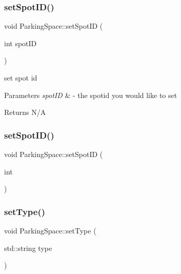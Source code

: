 \subsubsection{\texorpdfstring{set\+Spot\+I\+D()}{setSpotID()}\hspace{0.1cm}{\footnotesize\ttfamily [1/2]}}
{\footnotesize\ttfamily void Parking\+Space\+::set\+Spot\+ID (\begin{DoxyParamCaption}\item[{int}]{spot\+ID }\end{DoxyParamCaption})}



set spot id 


\begin{DoxyParams}{Parameters}
{\em spot\+ID} & -\/ the spotid you would like to set \\
\hline
\end{DoxyParams}
\begin{DoxyReturn}{Returns}
N/A 
\end{DoxyReturn}
\mbox{\label{class_parking_space_a9acf2d76a9b9f84d049b44dd0d4a5c8b}} 
\subsubsection{\texorpdfstring{set\+Spot\+I\+D()}{setSpotID()}\hspace{0.1cm}{\footnotesize\ttfamily [2/2]}}
{\footnotesize\ttfamily void Parking\+Space\+::set\+Spot\+ID (\begin{DoxyParamCaption}\item[{int}]{ }\end{DoxyParamCaption})}

\mbox{\label{class_parking_space_a4abd727d17e2045ef0617fb68e8135ed}} 
\subsubsection{\texorpdfstring{set\+Type()}{setType()}\hspace{0.1cm}{\footnotesize\ttfamily [1/2]}}
{\footnotesize\ttfamily void Parking\+Space\+::set\+Type (\begin{DoxyParamCaption}\item[{std\+::string}]{type }\end{DoxyParamCaption})}



